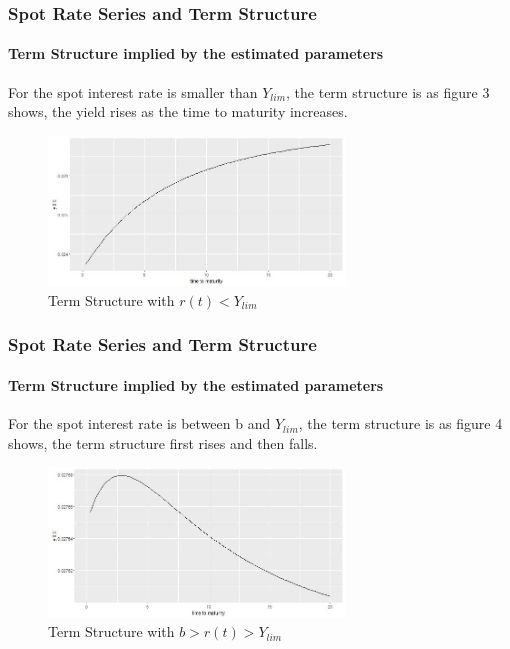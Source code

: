 \documentclass[11pt]{beamer}
\begin{document}
	
	\begin{frame}
		\frametitle{Spot Rate Series and Term Structure}
		\framesubtitle{Term Structure implied by the estimated parameters}
		For the spot interest rate is smaller than $ Y_{lim} $, the term structure is as figure 3 shows, the yield rises as the time to maturity increases.
		\begin{figure}[H]
			\centering
			\includegraphics[height=0.4\textwidth,width=0.7\textwidth]{figure3}
			\caption{Term Structure with $ r(t)<Y_{lim} $}
			\label{fige3}
		\end{figure}
	\end{frame}
	
	
	\begin{frame}
		\frametitle{Spot Rate Series and Term Structure}
		\framesubtitle{Term Structure implied by the estimated parameters}
		For the spot interest rate is between b and $ Y_{lim} $, the term structure is as figure 4 shows, the term structure first rises and then falls.
		\begin{figure}[H]
			\centering
			\includegraphics[height=0.4\textwidth,width=0.7\textwidth]{figure4}
			\caption{Term Structure with $ b>r(t)>Y_{lim} $}
			\label{fige4}
		\end{figure}
	\end{frame}
\end{document}
